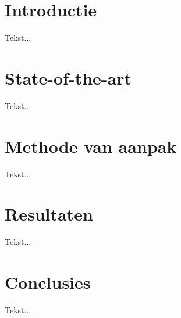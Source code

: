 \documentclass[fleqn,10pt]{voorstel}
\begin{document}
\flushbottom %

\maketitle %

\tableofcontents %

\thispagestyle{empty} %


\section{Introductie} %
Tekst...


\section{State-of-the-art}
Tekst...


\section{Methode van aanpak}
Tekst...

\section{Resultaten}
Tekst...

\section{Conclusies}
Tekst...




\end{document}
